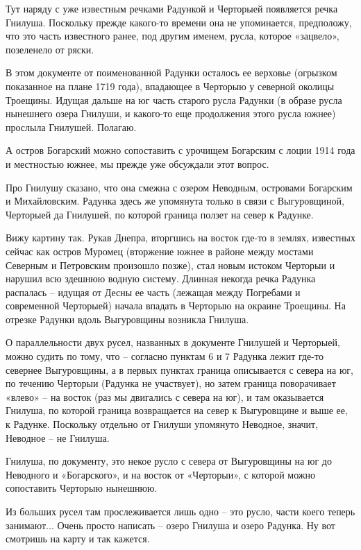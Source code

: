Тут наряду с уже известным речками Радункой и Черторыей появляется речка Гнилуша. Поскольку прежде какого-то времени она не упоминается, предположу, что это часть известного ранее, под другим именем, русла, которое «зацвело», позеленело от ряски.


В этом документе от поименованной Радунки осталось ее верховье (огрызком показанное на плане 1719 года), впадающее в Черторыю у северной околицы Троещины. Идущая дальше на юг часть старого русла Радунки (в образе русла нынешнего озера Гнилуши, и какого-то еще продолжения этого русла южнее) прослыла Гнилушей. Полагаю.

А остров Богарский можно сопоставить с урочищем Богарским с лоции 1914 года и местностью южнее, мы прежде уже обсуждали этот вопрос.

Про Гнилушу сказано, что она смежна с озером Неводным, островами Богарским и Михайловским. Радунка здесь же упомянута только в связи с Выгуровщиной, Черторыей да Гнилушей, по которой граница ползет на север к Радунке.

Вижу картину так. Рукав Днепра, вторгшись на восток где-то в землях, известных сейчас как остров Муромец (вторжение южнее в районе между мостами Северным и Петровским произошло позже), стал новым истоком Черторыи и нарушил всю здешнюю водную систему. Длинная некогда речка Радунка распалась – идущая от Десны ее часть (лежащая между Погребами и современной Черторыей) начала впадать в Черторыю на окраине Троещины. На отрезке Радунки вдоль Выгуровщины возникла Гнилуша.

О параллельности двух русел, названных в документе Гнилушей и Черторыей, можно судить по тому, что – согласно пунктам 6 и 7 Радунка лежит где-то севернее Выгуровщины, а в первых пунктах граница описывается с севера на юг, по течению Черторыи (Радунка не участвует), но затем граница поворачивает «влево» – на восток (раз мы двигались с севера на юг), и там оказывается Гнилуша, по которой граница возвращается на север к Выгуровщине и выше ее, к Радунке. Поскольку отдельно от Гнилуши упомянуто Неводное, значит, Неводное – не Гнилуша.

Гнилуша, по документу, это некое русло с севера от Выгуровщины на юг до Неводного и «Богарского», и на восток от «Черторыи», с которой можно сопоставить Черторыю нынешнюю.

Из больших русел там прослеживается лишь одно – это русло, части коего теперь занимают... Очень просто написать – озеро Гнилуша и озеро Радунка. Ну вот смотришь на карту и так кажется. 

